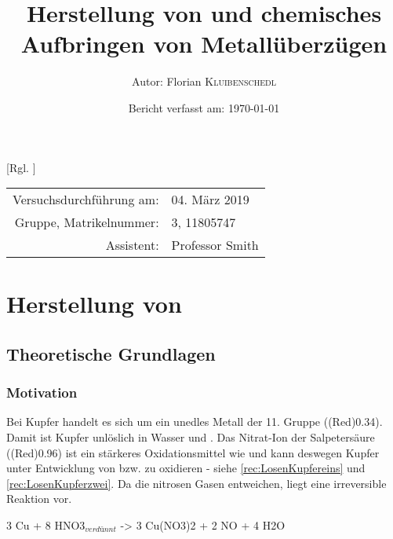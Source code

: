 \documentclass{article}
\title{Herstellung von \ch{CuSO4 * 5 H2O} und chemisches Aufbringen von Metallüberzügen} %
\author{Autor: Florian \textsc{Kluibenschedl}} %
\date{Bericht verfasst am: \today} %
\begin{document}
  [Rgl. ]{}{}
  
  \maketitle %
  
  \begin{center}
    \begin{tabular}{r l}
      Versuchsdurchführung am: & 04. März 2019\\ %
      Gruppe, Matrikelnummer: & 3, 11805747 \\
      Assistent: & Professor Smith %
    \end{tabular}
  \end{center}


  \begin{abstract}
    
  \end{abstract}
  
  \section{Herstellung von }
  
    \subsection{Theoretische Grundlagen}
  
      \subsubsection{Motivation} \label{sec:MotivationKupfer}
        
        Bei Kupfer handelt es sich um ein unedles Metall der 11. Gruppe (\ElPot[superscript=0](Red){0.34}). Damit ist Kupfer unlöslich in Wasser und . Das Nitrat-Ion der Salpetersäure (\ElPot[superscript=0](Red){0.96}) ist ein stärkeres Oxidationsmittel wie  und kann deswegen Kupfer unter Entwicklung von  bzw.  zu  oxidieren - siehe \ref{rec:LosenKupfereins} und \ref{rec:LosenKupferzwei}. Da die nitrosen Gasen entweichen, liegt eine irreversible Reaktion vor.
        
        \begin{reaction}
          3 Cu\sld{} + 8 HNO3\aq$_{verdünnt}$ -> 3 Cu(NO3)2\aq{} + 2 NO\gas{} + 4 H2O \label{rec:LosenKupfereins}
        \end{reaction} 
          
\end{document}

